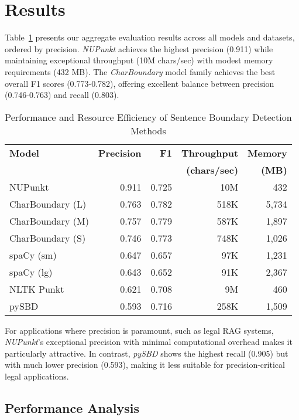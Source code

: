 \section{Results}

Table~\ref{tab:main-results} presents our aggregate evaluation results across all models and datasets, ordered by precision. \textit{NUPunkt} achieves the highest precision (0.911) while maintaining exceptional throughput (10M chars/sec) with modest memory requirements (432 MB). The \textit{CharBoundary} model family achieves the best overall F1 scores (0.773-0.782), offering excellent balance between precision (0.746-0.763) and recall (0.803).

\begin{table}[t]
\centering
\caption{Performance and Resource Efficiency of Sentence Boundary Detection Methods}
\label{tab:main-results}
\begin{tabular}{lrrrr}
\toprule
\textbf{Model} & \textbf{Precision} & \textbf{F1} & \textbf{Throughput} & \textbf{Memory} \\
 & & & \textbf{(chars/sec)} & \textbf{(MB)} \\
\midrule
NUPunkt & 0.911 & 0.725 & 10M & 432 \\
CharBoundary (L) & 0.763 & 0.782 & 518K & 5,734 \\
CharBoundary (M) & 0.757 & 0.779 & 587K & 1,897 \\
CharBoundary (S) & 0.746 & 0.773 & 748K & 1,026 \\
spaCy (sm) & 0.647 & 0.657 & 97K & 1,231 \\
spaCy (lg) & 0.643 & 0.652 & 91K & 2,367 \\
NLTK Punkt & 0.621 & 0.708 & 9M & 460 \\
pySBD & 0.593 & 0.716 & 258K & 1,509 \\
\bottomrule
\end{tabular}
\end{table}

For applications where precision is paramount, such as legal RAG systems, \textit{NUPunkt}'s exceptional precision with minimal computational overhead makes it particularly attractive. In contrast, \textit{pySBD} shows the highest recall (0.905) but with much lower precision (0.593), making it less suitable for precision-critical legal applications.

\subsection{Performance Analysis}

